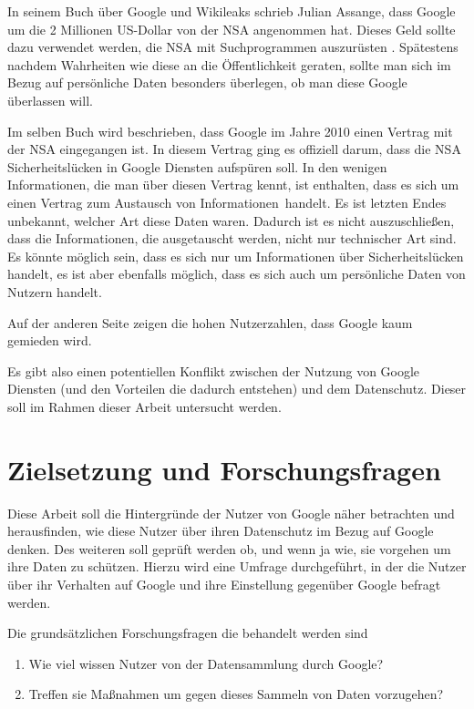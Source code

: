 In seinem Buch über Google und Wikileaks schrieb Julian Assange, dass Google um die 2 Millionen US-Dollar von der NSA angenommen hat. Dieses Geld sollte dazu verwendet werden, die NSA mit Suchprogrammen auszurüsten \cite{assangebook}. Spätestens nachdem Wahrheiten wie diese an die Öffentlichkeit geraten, sollte man sich im Bezug auf persönliche Daten besonders überlegen, ob man diese Google überlassen will.

Im selben Buch wird beschrieben, dass Google im Jahre 2010 einen Vertrag mit der NSA eingegangen ist. In diesem Vertrag ging es offiziell darum, dass die NSA Sicherheitslücken in Google Diensten aufspüren soll. In den wenigen Informationen, die man über diesen Vertrag kennt, ist enthalten, dass es sich um einen Vertrag zum \glqq Austausch von Informationen\grqq\ handelt. Es ist letzten Endes unbekannt, welcher Art diese Daten waren. Dadurch ist es nicht auszuschließen, dass die Informationen, die ausgetauscht werden, nicht nur technischer Art sind. Es könnte möglich sein, dass es sich nur um Informationen über Sicherheitslücken handelt, es ist aber ebenfalls möglich, dass es sich auch um persönliche Daten von Nutzern handelt.

Auf der anderen Seite zeigen die hohen Nutzerzahlen, dass Google kaum gemieden wird.

Es gibt also einen potentiellen Konflikt zwischen der Nutzung von Google Diensten (und den Vorteilen die dadurch entstehen) und dem Datenschutz. Dieser soll im Rahmen dieser Arbeit untersucht werden.

\section{Zielsetzung und Forschungsfragen}
\label{sec:questions}
Diese Arbeit soll die Hintergründe der Nutzer von Google näher betrachten und herausfinden, wie diese Nutzer über ihren Datenschutz im Bezug auf Google denken. Des weiteren soll geprüft werden ob, und wenn ja wie, sie vorgehen um ihre Daten zu schützen. Hierzu wird eine Umfrage durchgeführt, in der die Nutzer über ihr Verhalten auf Google und ihre Einstellung gegenüber Google befragt werden.

Die grundsätzlichen Forschungsfragen die behandelt werden sind
\begin{enumerate}
\item Wie viel wissen Nutzer von der Datensammlung durch Google?
\item Treffen sie Maßnahmen um gegen dieses Sammeln von Daten vorzugehen?
\end{enumerate}